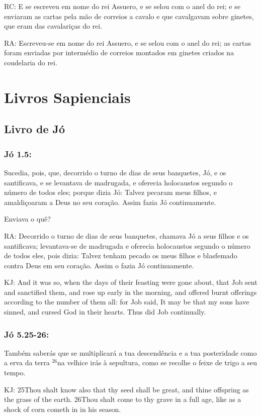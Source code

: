 RC: E se escreveu em nome do rei Assuero, e se selou com o anel do rei; e se enviaram as cartas pela mão de correios a cavalo e que cavalgavam sobre ginetes, que eram das cavalariças do rei.

RA: Escreveu-se em nome do rei Assuero, e se selou com o anel do rei; as cartas foram enviadas por intermédio de correios montados em ginetes criados na coudelaria do rei.

\chapter{Livros Sapienciais}
\section{Livro de Jó}
\subsection{Jó 1.5:}

 Sucedia, pois, que, decorrido o turno de dias de seus banquetes,  Jó, e os santificava, e se levantava de madrugada, e oferecia holocaustos segundo o número de todos eles; porque dizia Jó: Talvez pecaram meus filhos, e amaldiçoaram a Deus no seu coração. Assim fazia Jó continuamente.

Enviava o quê?

RA: Decorrido o turno de dias de seus banquetes, chamava Jó a seus filhos e os santificava; levantava-se de madrugada e oferecia holocaustos segundo o número de todos eles, pois dizia: Talvez tenham pecado os meus filhos e blasfemado contra Deus em seu coração. Assim o fazia Jó continuamente.

KJ: And it was so, when the days of their feasting were gone about, that Job sent and sanctified them, and rose up early in the morning, and offered burnt offerings according to the number of them all: for Job said, It may be that my sons have sinned, and cursed God in their hearts. Thus did Job continually.

\subsection{Jó 5.25-26:}

 Também saberás que se multiplicará a tua descendência e a tua posteridade como a erva da terra\uwave{,} $^{\mathrm{26}}$na velhice irás à sepultura, como se recolhe o feixe de trigo a seu tempo.


KJ: 25Thou shalt know also that thy seed shall be great, and thine offspring as the grass of the earth. 26Thou shalt come to thy grave in a full age, like as a shock of corn cometh in in his season.

